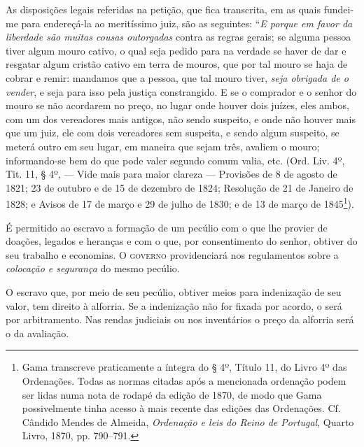 As disposições legais referidas na petição, que fica transcrita, em as
quais fundei-me para endereçá-la ao meritíssimo juiz, são as seguintes:
``\emph{E porque em favor da liberdade são muitas cousas outorgadas}
contra as regras gerais; se alguma pessoa tiver algum mouro cativo, o
qual seja pedido para na verdade se haver de dar e resgatar algum
cristão cativo em terra de mouros, que por tal mouro se haja de cobrar e
remir: mandamos que a pessoa, que tal mouro tiver, \emph{seja obrigada
de o vender}, e seja para isso pela justiça constrangido. E se o
comprador e o senhor do mouro se não acordarem no preço, no lugar onde
houver dois juízes, eles ambos, com um dos vereadores mais antigos, não
sendo suspeito, e onde não houver mais que um juiz, ele com dois
vereadores sem suspeita, e sendo algum suspeito, se meterá outro em seu
lugar, em maneira que sejam três, avaliem o mouro; informando-se bem do
que pode valer segundo comum valia, etc. (Ord. Liv. 4º, Tit. 11, § 4º, ---
Vide mais para maior clareza --- Provisões de 8 de agosto de 1821; 23 de
outubro e de 15 de dezembro de 1824; Resolução de 21 de Janeiro de 1828;
e Avisos de 17 de março e 29 de julho de 1830; e de 13 de março de
1845\footnote{ Gama transcreve praticamente a íntegra do § 4º, Título
  11, do Livro 4º das Ordenações. Todas as normas citadas após a
  mencionada ordenação podem ser lidas numa nota de rodapé da edição de
  1870, de modo que Gama possivelmente tinha acesso à mais recente das
  edições das Ordenações. Cf. Cândido Mendes de Almeida, \emph{Ordenação
  e leis do Reino de Portugal}, Quarto Livro, 1870, pp. 790--791.}).

É permitido ao escravo a formação de um pecúlio com o que lhe provier de
doações, legados e heranças e com o que, por consentimento do senhor,
obtiver do seu trabalho e economias. O \textsc{governo} providenciará nos
regulamentos sobre a \emph{colocação e segurança} do mesmo pecúlio.

O escravo que, por meio de seu pecúlio, obtiver meios para indenização
de seu valor, tem direito à alforria. Se a indenização não for fixada
por acordo, o será por arbitramento. Nas rendas judiciais ou nos
inventários o preço da alforria será o da avaliação.

